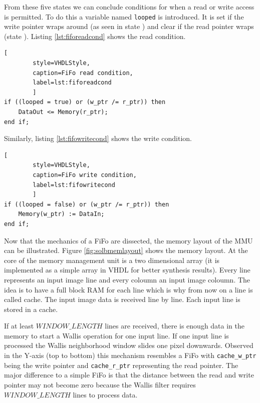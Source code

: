 From these five states we can conclude conditions for when a read or write access is
permitted. To do this a variable named \texttt{looped} is introduced. It is set
if the write pointer wraps around (as seen in state ) and clear if the
read pointer wraps (state ). Listing \ref{lst:fiforeadcond} shows the
read condition.

\begin{minipage}{\linewidth}
    \begin{lstlisting}[
        style=VHDLStyle, 
        caption=FiFo read condition, 
        label=lst:fiforeadcond
        ]
if ((looped = true) or (w_ptr /= r_ptr)) then
    DataOut <= Memory(r_ptr);
end if;\end{lstlisting}
\end{minipage}

Similarly, listing \ref{lst:fifowritecond} shows the write condition.

\begin{minipage}{\linewidth}
    \begin{lstlisting}[
        style=VHDLStyle, 
        caption=FiFo write condition, 
        label=lst:fifowritecond
        ]
if ((looped = false) or (w_ptr /= r_ptr)) then
    Memory(w_ptr) := DataIn;
end if;\end{lstlisting}
\end{minipage}

Now that the mechanics of a FiFo are dissected, the memory layout of the
MMU can be illustrated. Figure \ref{fig:solbmemlayout} shows the memory layout.
At the core of the memory management unit is a two
dimensional array (it is implemented as a simple array in VHDL for better
synthesis results). Every line represents an input image line and every coloumn an
input
image coloumn. The idea is to have a full block RAM for each line which is why
from now on a line is called cache. The input image data is received line by
line. Each input line is stored in a cache. 

\clearpage
If at least $WINDOW\_LENGTH$ lines
are received, there is enough data in the memory to start a Wallis operation for
one input line. If one input line is processed the Wallis neighborhood
window slides one pixel downwards. Observed in the Y-axis (top to bottom) this
mechanism resembles
a FiFo with \texttt{cache\_w\_ptr} being the write pointer and 
\texttt{cache\_r\_ptr} representing the read pointer. The major difference to a
simple FiFo is that the distance between the read and write pointer may not
become zero because the Wallis filter requires $WINDOW\_LENGTH$ lines to process
data.

